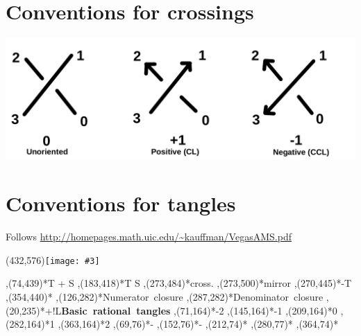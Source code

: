 \documentclass[12pt]{article}
\newenvironment{xyoverpic}[3]
{%
\begin{xy}
\xyimport#1{\texttt{[image: \#3]}}
}{\end{xy}}
\newenvironment{cxyoverpic}[3]
{%
\begin{center}
\centering\leavevmode\large
\begin{xyoverpic}{#1}{#2}{#3}
}{\end{xyoverpic}
\end{center}}
\begin{document}
\section{Conventions for crossings}

\includegraphics[scale=0.6]{pics/crossings}

\pagebreak

\section{Conventions for tangles}

Follows \url{http://homepages.math.uic.edu/~kauffman/VegasAMS.pdf
}

\begin{cxyoverpic}{(432,576)}{scale=1.0}{pics/tangles}
    ,(74,439)*{T + S}
    ,(183,418)*{T \ast S}
    ,(273,484)*{\mbox{\scriptsize cross.}}
    ,(273,500)*{\mbox{\scriptsize mirror}}
    ,(270,445)*{-T}
    ,(354,440)*{\displaystyle{}}
    ,(126,282)*{\mbox{\normalsize Numerator closure}}
    ,(287,282)*{\mbox{\normalsize Denominator closure}}
    ,(20,235)*+!L{\mbox{\textbf{Basic rational tangles}}}
    ,(71,164)*{-2}
    ,(145,164)*{-1}
    ,(209,164)*{0}
    ,(282,164)*{1}
    ,(363,164)*{2}
    ,(69,76)*{\displaystyle -}
    ,(152,76)*{\displaystyle-}
    ,(212,74)*{\infty}
    ,(280,77)*{\displaystyle{}}
    ,(364,74)*{\displaystyle{}}
\end{cxyoverpic}
\end{document}
